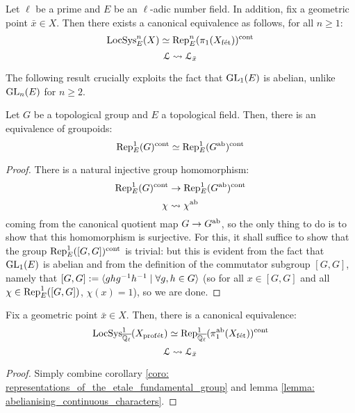         \begin{corollary} \label{coro: representations_of_the_etale_fundamental_group}
            Let $\ell$ be a prime and $E$ be an $\ell$-adic number field. In addition, fix a geometric point $\bar{x} \in X$. Then there exists a canonical equivalence as follows, for all $n \geq 1$:
                $$\mathrm{LocSys}^n_E(X) \simeq \mathrm{Rep}_E^n(\pi_1(X_{\mathrm{f\acute{e}t}}))^{\mathrm{cont}}$$
                $$\mathcal{L} \leadsto \mathcal{L}_{\bar{x}}$$
        \end{corollary}
            
        The following result crucially exploits the fact that $\operatorname{GL}_1(E)$ is abelian, unlike $\operatorname{GL}_n(E)$ for $n \geq 2$.
        \begin{lemma} \label{lemma: abelianising_continuous_characters}
            Let $G$ be a topological group and $E$ a topological field. Then, there is an equivalence of groupoids:
                $$\mathrm{Rep}^1_E(G)^{\mathrm{cont}} \simeq \mathrm{Rep}^1_E(G^{\mathrm{ab}})^{\mathrm{cont}}$$
        \end{lemma}
            \begin{proof}
                There is a natural injective group homomorphism:
                    $$\mathrm{Rep}^1_E(G)^{\mathrm{cont}} \to \mathrm{Rep}^1_E(G^{\mathrm{ab}})^{\mathrm{cont}}$$
                    $$\chi \leadsto \chi^{\mathrm{ab}}$$
                coming from the canonical quotient map $G \to G^{\mathrm{ab}}$, so the only thing to do is to show that this homomorphism is surjective. For this, it shall suffice to show that the group $\mathrm{Rep}^1_E([G, G])^{\mathrm{cont}}$ is trivial: but this is evident from the fact that $\operatorname{GL}_1(E)$ is abelian and from the definition of the commutator subgroup $[G, G]$, namely that $[G, G] := \langle ghg^{-1}h^{-1} \mid \forall g, h \in G\rangle$ (so for all $x \in [G, G]$ and all $\chi \in \mathrm{Rep}^1_E([G, G])$, $\chi(x) = 1$), so we are done.
            \end{proof}
        \begin{theorem} \label{theorem: unramified_representations_are_sheaves_on_X}
            Fix a geometric point $\bar{x} \in X$. Then, there is a canonical equivalence:
                $$\mathrm{LocSys}^1_{\overline{\mathbb{Q}_{\ell}}}(X_{\mathrm{prof\acute{e}t}}) \simeq \mathrm{Rep}^1_{\overline{\mathbb{Q}_{\ell}}}(\pi_1^{\mathrm{ab}}(X_{\mathrm{f\acute{e}t}}))^{\mathrm{cont}}$$
                $$\mathcal{L} \leadsto \mathcal{L}_{\bar{x}}$$
        \end{theorem}
            \begin{proof}
                Simply combine corollary \ref{coro: representations_of_the_etale_fundamental_group} and lemma \ref{lemma: abelianising_continuous_characters}.
            \end{proof}
